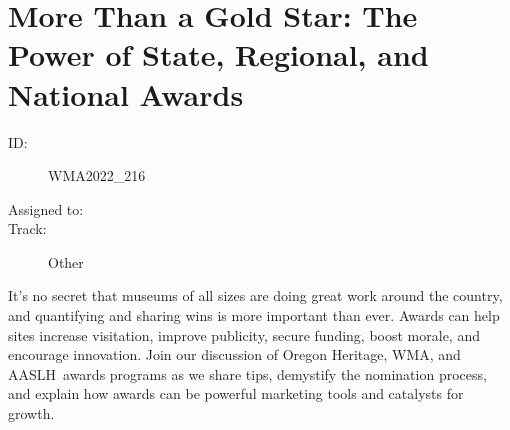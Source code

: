 \documentclass{report}
\begin{document}
              

              

              
        
          \newpage
          \section{ More Than a Gold Star: The Power of State, Regional, and National Awards }
            \begin{description}
              \item [ID:]
              WMA2022\_216

              \item [Assigned to:]
                \item [Track:]Other~
              \end{description}

              It’s no secret that museums of all sizes are doing great work around the country, and quantifying and sharing wins is more important than ever. Awards can help sites increase visitation, improve publicity, secure funding, boost morale, and encourage innovation. Join our discussion of Oregon Heritage, WMA, and AASLH awards programs as we share tips, demystify the nomination process, and explain how awards can be powerful marketing tools and catalysts for growth.
\end{document}
